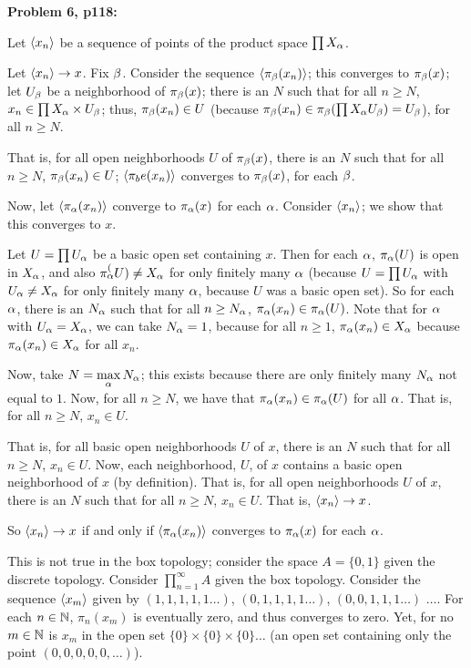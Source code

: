 \documentclass[a4paper,12pt]{article}
\begin{document}
\shunt

{\bf Problem 6, p118:}

Let $\left\langle x_n \right\rangle$ be a sequence of points of the product space $\prod X_\alpha$.

Let $\left\langle x_n \right\rangle \to x$. Fix $\beta$. Consider the sequence $\left\langle \pi_\beta(x_n) \right\rangle$; this converges to $\pi_\beta(x)$; let $U_\beta$ be a neighborhood of $\pi_\beta(x)$; there is an $N$ such that for all $n \geq N$, $x_n \in \prod X_\alpha \times U_\beta$; thus, $\pi_\beta(x_n) \in U$ (because $\pi_\beta(x_n) \in \pi_\beta (\prod X_\alpha U_\beta )= U_\beta$), for all $n \geq N$. 

That is, for all open neighborhoods $U$ of $\pi_\beta(x)$, there is an $N$ such that for all $n \geq N$, $\pi_\beta(x_n) \in U$; $\left\langle \pi_be(x_n) \right\rangle$ converges to $\pi_\beta(x)$, for each $\beta$.

Now, let $\left\langle \pi_\alpha(x_n) \right\rangle$ converge to $\pi_\alpha(x)$ for each $\alpha$. Consider $\left\langle x_n \right\rangle$; we show that this converges to $x$.

Let $U=\prod U_\alpha$ be a basic open set containing $x$. Then for each $\alpha$, $\pi_\alpha(U)$ is open in $X_\alpha$, and also $\pi_\alpha^(U) \neq X_\alpha$ for only finitely many $\alpha$ (because $U = \prod U_\alpha$ with $U_\alpha \neq X_\alpha$ for only finitely many $\alpha$, because $U$ was a basic open set). So for each $\alpha$, there is an $N_\alpha$ such that for all $n \geq N_\alpha$, $\pi_\alpha(x_n) \in \pi_\alpha(U)$. Note that for $\alpha$ with $U_\alpha = X_\alpha$, we can take $N_\alpha = 1$, because for all $n \geq 1$, $\pi_\alpha(x_n) \in X_\alpha$ because $\pi_\alpha (x_n) \in X_\alpha$ for all $x_n$.

Now, take $N = \max\limits_{\alpha} N_\alpha$; this exists because there are only finitely many $N_\alpha$ not equal to $1$. Now, for all $n \geq N$, we have that $\pi_\alpha(x_n) \in \pi_\alpha(U)$ for all $\alpha$. That is, for all $n \geq N$, $x_n \in U$.

That is, for all basic open neighborhoods $U$ of $x$, there is an $N$ such that for all $n \geq N$, $x_n \in U$. Now, each neighborhood, $U$, of $x$ contains a basic open neighborhood of $x$ (by definition). That is, for all  open neighborhoods $U$ of $x$, there is an $N$ such that for all $n \geq N$, $x_n \in U$. That is, $\left\langle x_n \right\rangle \to x$.

So $\left\langle x_n \right\rangle \to x$ if and only if $\left\langle \pi_\alpha(x_n) \right\rangle$ converges to $\pi_\alpha(x)$ for each $\alpha$.

This is not true in the box topology; consider the space $A= \{0,1\}$ given the discrete topology. Consider $\prod_{n=1}^\infty A$ given the box topology. Consider the sequence $\left\langle x_m \right\rangle$ given by $(1,1,1,1,1 \ldots )$, $(0,1,1,1,1 \ldots)$, $(0,0,1,1,1 \ldots)$ $\ldots$. For each $n \in \mathbb{N}$, $\pi_n(x_m)$ is eventually zero, and thus converges to zero. Yet, for no $m \in \mathbb{N}$ is $x_m$ in the open set $\{0\} \times \{0\} \times \{0\} \ldots$ (an open set containing only the point $(0,0,0,0,0,\ldots)$).
\end{document}
